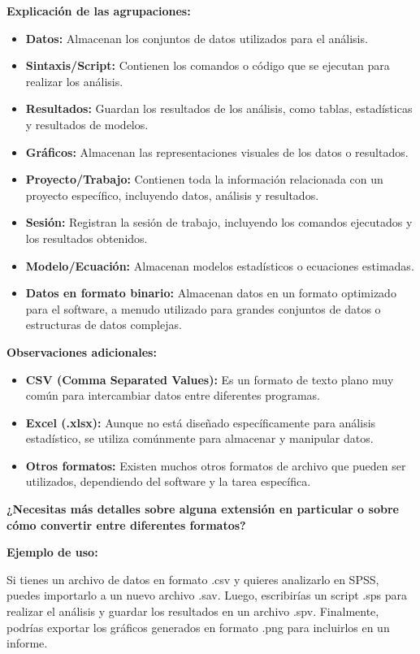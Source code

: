 \documentclass[
  stu,
  floatsintext,
  longtable,
  a4paper,
  nolmodern,
  notxfonts,
  notimes,
  colorlinks=true,linkcolor=blue,citecolor=blue,urlcolor=blue]{apa7}
\providecommand{\tightlist}{%
  \setlength{\itemsep}{0pt}\setlength{\parskip}{0pt}}
\begin{document}
\textbf{Explicación de las agrupaciones:}

\begin{itemize}
\tightlist
\item
  \textbf{Datos:} Almacenan los conjuntos de datos utilizados para el
  análisis.
\item
  \textbf{Sintaxis/Script:} Contienen los comandos o código que se
  ejecutan para realizar los análisis.
\item
  \textbf{Resultados:} Guardan los resultados de los análisis, como
  tablas, estadísticas y resultados de modelos.
\item
  \textbf{Gráficos:} Almacenan las representaciones visuales de los
  datos o resultados.
\item
  \textbf{Proyecto/Trabajo:} Contienen toda la información relacionada
  con un proyecto específico, incluyendo datos, análisis y resultados.
\item
  \textbf{Sesión:} Registran la sesión de trabajo, incluyendo los
  comandos ejecutados y los resultados obtenidos.
\item
  \textbf{Modelo/Ecuación:} Almacenan modelos estadísticos o ecuaciones
  estimadas.
\item
  \textbf{Datos en formato binario:} Almacenan datos en un formato
  optimizado para el software, a menudo utilizado para grandes conjuntos
  de datos o estructuras de datos complejas.
\end{itemize}

\textbf{Observaciones adicionales:}

\begin{itemize}
\tightlist
\item
  \textbf{CSV (Comma Separated Values):} Es un formato de texto plano
  muy común para intercambiar datos entre diferentes programas.
\item
  \textbf{Excel (.xlsx):} Aunque no está diseñado específicamente para
  análisis estadístico, se utiliza comúnmente para almacenar y manipular
  datos.
\item
  \textbf{Otros formatos:} Existen muchos otros formatos de archivo que
  pueden ser utilizados, dependiendo del software y la tarea específica.
\end{itemize}

\textbf{¿Necesitas más detalles sobre alguna extensión en particular o
sobre cómo convertir entre diferentes formatos?}

\textbf{Ejemplo de uso:}

Si tienes un archivo de datos en formato .csv y quieres analizarlo en
SPSS, puedes importarlo a un nuevo archivo .sav. Luego, escribirías un
script .sps para realizar el análisis y guardar los resultados en un
archivo .spv. Finalmente, podrías exportar los gráficos generados en
formato .png para incluirlos en un informe.
\end{document}
